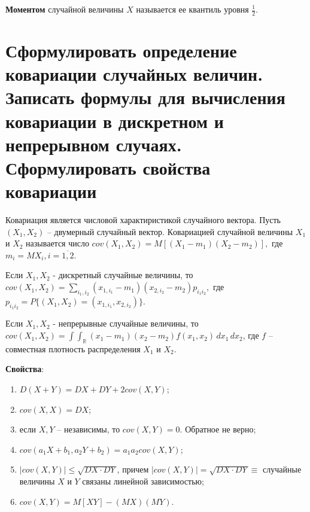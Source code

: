 \textbf{Моментом} случайной величины $X$ называется ее квантиль уровня $\frac{1}{2}$.

\section{Сформулировать определение ковариации случайных величин. Записать формулы для вычисления ковариации в дискретном и непрерывном случаях. Сформулировать свойства ковариации}

Ковариация является числовой характиристикой случайного вектора. Пусть $(X_1, X_2)$ -- двумерный случайный вектор. $Ковариацией$ случайной величины $X_1$ и $X_2$ называется число $cov(X_1, X_2) = M[(X_1 - m_1)(X_2 - m_2)],$ где $m_i = MX_i, i = \overline{1, 2}$.

Если $X_1, X_2$ - дискретный случайные величины, то $cov(X_1, X_2) = \sum_{i_1, i_2}(x_{1, i_1}-m_1)(x_{2, i_2}-m_2)p_{i_1i_2},$ где $p_{i_1i_2} = P\{(X_1, X_2) = (x_{1, i_1}, x_{2, i_2})\}$.

Если $X_1, X_2$ - непрерывные случайные величины, то $cov(X_1, X_2) = \int \int_{\mathbb{R}} (x_1 - m_1)(x_2 - m_2) f(x_1, x_2) \, dx_1 \,dx_2$, где $f$ -- совместная плотность распределения $X_1$ и $X_2$.

\textbf{Свойства}:
\begin{enumerate}
	\item $D(X+Y) = DX + DY + 2cov(X, Y)$;
	\item $cov(X, X) = DX$;
	\item если $X, Y$ -- независимы, то $cov(X, Y) = 0.$ Обратное не верно;
	\item $cov(a_1X + b_1, a_2Y + b_2) = a_1a_2cov(X, Y)$;
	\item $|cov(X, Y)| \leq \sqrt{DX \cdot DY}$, причем $|cov(X, Y)| = \sqrt{DX \cdot DY} \equiv$ случайные величины $X$ и $Y$ связаны линейной зависимостью;
	\item $cov(X, Y) = M[XY] - (MX)(MY)$.
\end{enumerate}
